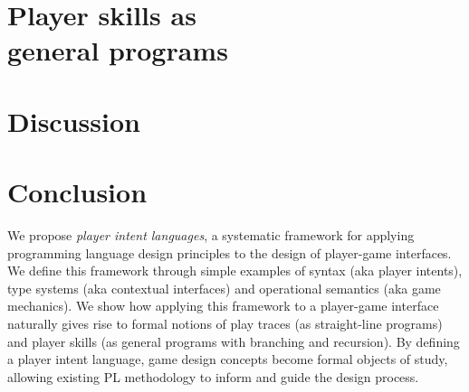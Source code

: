 \documentclass[sigconf]{acmart}
\begin{document}

  
% 

\section{Player skills as \\ general programs}
\label{sec:skills}



\section{Discussion}
\label{sec:discussion}


\section{Conclusion}
\label{sec:conclusion}

We propose \emph{player intent languages}, a systematic framework for
applying programming language design principles to the design of
player-game interfaces.
%
We define this framework through simple examples of syntax (aka player
intents), type systems (aka contextual interfaces) and operational
semantics (aka game mechanics).
%
We show how applying this framework to a player-game interface
naturally gives rise to formal notions of play traces (as
straight-line programs) and player skills (as general programs with
branching and recursion).
%
By defining a player intent language, game design concepts become
formal objects of study, allowing existing PL methodology to inform and
guide the design process.

%
%
  
% 
% 
% 

  



 
\end{document}
